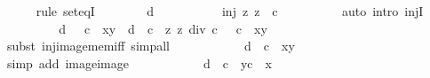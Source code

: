 \begin{isabellebody}
\ \ \ \ \isamarkupfalse%
\ {\isacharparenleft}{\kern0pt}rule\ set{\isacharunderscore}{\kern0pt}eqI{\isacharparenright}{\kern0pt}\isanewline
\ \ \ \ \ \ \isamarkupfalse%
\ d\isanewline
\ \ \ \ \ \ \isamarkupfalse%
\ {}\ \isamarkupfalse%
\ {\isachardoublequoteopen}inj\ {\isacharparenleft}{\kern0pt}{\isasymlambda}z{\isachardot}{\kern0pt}\ z\ {\isacharslash}{\kern0pt}\ c{\isacharparenright}{\kern0pt}{\isachardoublequoteclose}\isanewline
\ \ \ \ \ \ \ \ \isamarkupfalse%
\ {\isacharparenleft}{\kern0pt}auto\ intro{\isacharcolon}{\kern0pt}\ injI{\isacharparenright}{\kern0pt}\isanewline
\ \ \ \ \ \ \isamarkupfalse%
\ \isamarkupfalse%
\ {\isachardoublequoteopen}d\ {\isasymin}\ {\isacharparenleft}{\kern0pt}{\isacharasterisk}{\kern0pt}{\isacharparenright}{\kern0pt}\ c\ {\isacharbackquote}{\kern0pt}\ {\isacharbraceleft}{\kern0pt}x{\isachardot}{\kern0pt}{\isachardot}{\kern0pt}y{\isacharbraceright}{\kern0pt}\ {\isasymlongleftrightarrow}\ d\ {\isacharslash}{\kern0pt}\ c\ {\isasymin}\ {\isacharparenleft}{\kern0pt}{\isasymlambda}z{\isachardot}{\kern0pt}\ z\ div\ c{\isacharparenright}{\kern0pt}\ {\isacharbackquote}{\kern0pt}\ {\isacharparenleft}{\kern0pt}{\isacharasterisk}{\kern0pt}{\isacharparenright}{\kern0pt}\ c\ {\isacharbackquote}{\kern0pt}\ {\isacharbraceleft}{\kern0pt}x{\isachardot}{\kern0pt}{\isachardot}{\kern0pt}y{\isacharbraceright}{\kern0pt}{\isachardoublequoteclose}\isanewline
\ \ \ \ \ \ \ \ \isamarkupfalse%
\ {\isacharparenleft}{\kern0pt}subst\ inj{\isacharunderscore}{\kern0pt}image{\isacharunderscore}{\kern0pt}mem{\isacharunderscore}{\kern0pt}iff{\isacharparenright}{\kern0pt}\ simp{\isacharunderscore}{\kern0pt}all\isanewline
\ \ \ \ \ \ \isamarkupfalse%
\ \isamarkupfalse%
\ {\isachardoublequoteopen}{\isasymdots}\ {\isasymlongleftrightarrow}\ d\ {\isacharslash}{\kern0pt}\ c\ {\isasymin}\ {\isacharbraceleft}{\kern0pt}x{\isachardot}{\kern0pt}{\isachardot}{\kern0pt}y{\isacharbraceright}{\kern0pt}{\isachardoublequoteclose}\isanewline
\ \ \ \ \ \ \ \ \isamarkupfalse%
\ {}\ \isamarkupfalse%
\ {\isacharparenleft}{\kern0pt}simp\ add{\isacharcolon}{\kern0pt}\ image{\isacharunderscore}{\kern0pt}image{\isacharparenright}{\kern0pt}\isanewline
\ \ \ \ \ \ \isamarkupfalse%
\ \isamarkupfalse%
\ {\isachardoublequoteopen}{\isasymdots}\ {\isasymlongleftrightarrow}\ d\ {\isasymin}\ {\isacharbraceleft}{\kern0pt}c\ {\isacharasterisk}{\kern0pt}\ y{\isachardot}{\kern0pt}{\isachardot}{\kern0pt}c\ {\isacharasterisk}{\kern0pt}\ x{\isacharbraceright}{\kern0pt}{\isachardoublequoteclose}\isanewline

\end{isabellebody}
